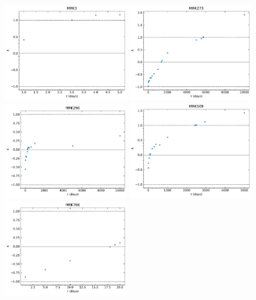 \begin{figure}
\begin{center}
    {
  \includegraphics[width=0.49\textwidth]{Figs/Chapter5/X_tau/X_tau_MRK3.pdf} \hfill 
  \includegraphics[width=0.49\textwidth]{Figs/Chapter5/X_tau/X_tau_MRK273.pdf} \hfill \\
  \includegraphics[width=0.49\textwidth]{Figs/Chapter5/X_tau/X_tau_MRK290.pdf} \hfill 
  \includegraphics[width=0.49\textwidth]{Figs/Chapter5/X_tau/X_tau_MRK509.pdf}  \\
  \includegraphics[width=0.49\textwidth]{Figs/Chapter5/X_tau/X_tau_MRK766.pdf}  \hfill 
}
\end{center}
\end{figure}
